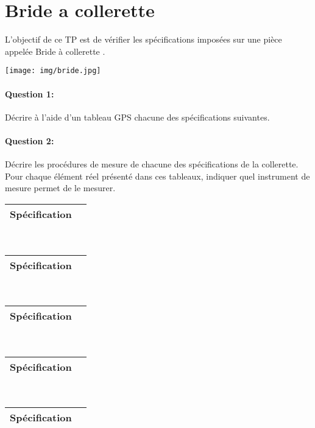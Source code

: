 

\section{Bride a collerette}

\begin{minipage}{0.4\linewidth}
L'objectif de ce TP est de vérifier les spécifications imposées sur une pièce appelée \og Bride à collerette \fg.
\end{minipage}
\hfill
\begin{minipage}{0.4\linewidth}
\texttt{[image: img/bride.jpg]}
\end{minipage}

\paragraph{Question 1:} Décrire à l'aide d'un tableau GPS chacune des spécifications suivantes.

\paragraph{Question 2:} Décrire les procédures de mesure de chacune des spécifications de la collerette. Pour chaque élément réel présenté dans ces tableaux, indiquer quel \og instrument de mesure \fg permet de le mesurer.

\renewcommand{\arraystretch}{1.5}

\begin{tabular}{|m{3cm}|m{5cm}|}
 \hline
 Spécification & \\
 \hline 
\end{tabular}

~\

\begin{tabular}{|m{3cm}|m{5cm}|}
 \hline
 Spécification & \\
 \hline 
\end{tabular}

~\

\begin{tabular}{|m{3cm}|m{5cm}|}
 \hline
 Spécification & \\
 \hline 
\end{tabular}

~\

\begin{tabular}{|m{3cm}|m{5cm}|}
 \hline
 Spécification & \\
 \hline 
\end{tabular}

~\

\begin{tabular}{|m{3cm}|m{5cm}|}
 \hline
 Spécification & \\
 \hline 
\end{tabular}








